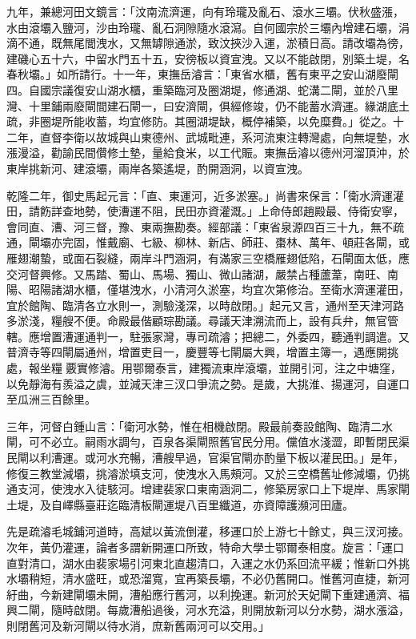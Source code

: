\begin{pinyinscope}
九年，兼總河田文鏡言：「汶南流濟運，向有玲瓏及亂石、滾水三壩。伏秋盛漲，水由滾壩入鹽河，沙由玲瓏、亂石洞隙隨水滾瀉。自何國宗於三壩內增建石壩，涓滴不通，既無尾閭洩水，又無罅隙通淤，致汶挾沙入運，淤積日高。請改壩為徬，建磯心五十六，中留水門五十五，安徬板以資宣洩。又以不能啟閉，別築土堤，名春秋壩。」如所請行。十一年，東撫岳濬言：「東省水櫃，舊有東平之安山湖廢閘四。自國宗議復安山湖水櫃，重築臨河及圈湖堤，修通湖、蛇溝二閘，並於八里灣、十里鋪兩廢閘間建石閘一，曰安濟閘，俱經修竣，仍不能蓄水濟運。緣湖底土疏，非圈堤所能收蓄，均宜修防。其圈湖堤缺，概停補築，以免糜費。」從之。十二年，直督李衛以故城與山東德州、武城毗連，系河流東注轉灣處，向無堤墊，水漲漫溢，勸諭民間儹修土墊，量給食米，以工代賑。東撫岳濬以德州河溜頂沖，於東岸挑新河、建滾壩，兩岸各築遙堤，酌開涵洞，以資宣洩。

乾隆二年，御史馬起元言：「直、東運河，近多淤塞。」尚書來保言：「衛水濟運灌田，請飭詳查地勢，使漕運不阻，民田亦資灌溉。」上命侍郎趙殿最、侍衛安寧，會同直、漕、河三督，豫、東兩撫勘奏。經部議：「東省泉源四百三十九，無不疏通，閘壩亦完固，惟戴廟、七級、柳林、新店、師莊、棗林、萬年、頓莊各閘，或雁翅潮蟄，或面石裂縫，兩岸斗門涵洞，有滿家三空橋雁翅低陷，石閘面太低，應交河督興修。又馬踏、蜀山、馬場、獨山、微山諸湖，嚴禁占種蘆葦，南旺、南陽、昭陽諸湖水櫃，僅堪洩水，小清河久淤塞，均宜次第修治。至衛水濟運灌田，宜於館陶、臨清各立水則一，測驗淺深，以時啟閉。」起元又言，通州至天津河路多淤淺，糧艘不便。命殿最偕顧琮勘議。尋議天津溯流而上，設有兵弁，無官管轄。應增置漕運通判一，駐張家灣，專司疏濬；把總二，外委四，聽通判調遣。又普濟寺等四閘屬通州，增置吏目一，慶豐等七閘屬大興，增置主簿一，遇應開挑處，報坐糧覈實修濬。用鄂爾泰言，建獨流東岸滾壩，並開引河，注之中塘窪，以免靜海有羨溢之虞，並減天津三汊口爭流之勢。是歲，大挑淮、揚運河，自運口至瓜洲三百餘里。

三年，河督白鍾山言：「衛河水勢，惟在相機啟閉。殿最前奏設館陶、臨清二水閘，可不必立。嗣雨水調勻，百泉各渠閘照舊官民分用。儻值水淺澀，即暫閉民渠民閘以利漕運。或河水充暢，漕艘早過，官渠官閘亦酌量下板以灌民田。」是年，修復三教堂減壩，挑濬淤填支河，使洩水入馬頰河。又於三空橋舊址修減壩，仍挑通支河，使洩水入徒駭河。增建裴家口東南涵洞二，修築房家口上下堤岸、馬家閘土堤，及自嶧縣臺莊迄臨清板閘運堤八百里纖道，亦資障護瀕河田廬。

先是疏濬毛城鋪河道時，高斌以黃流倒灌，移運口於上游七十餘丈，與三汊河接。次年，黃仍灌運，論者多謂新開運口所致，特命大學士鄂爾泰相度。旋言：「運口直對清口，湖水由裴家場引河東北直趨清口，入運之水仍系回流平緩；惟新口外挑水壩稍短，清水盛旺，或恐溜寬，宜再築長壩，不必仍舊開口。惟舊河直捷，新河紆曲，今新建閘壩未開，漕船應行舊河，以利挽運。新河於天妃閘下重建通濟、福興二閘，隨時啟閉。每歲漕船過後，河水充溢，則開放新河以分水勢，湖水漲溢，則閉舊河及新河閘以待水消，庶新舊兩河可以交用。」


\end{pinyinscope}
